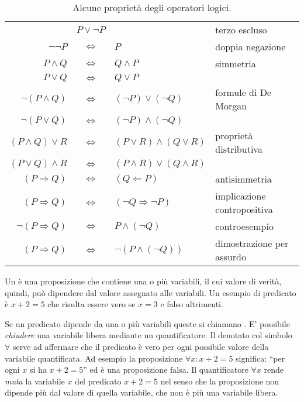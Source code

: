 \begin{table}
\begin{tabular}{rcll}
                         &$P \lor \neg P$&                                       &terzo escluso \\
                         $\neg \neg P$ & $\iff$ & $ P$                           & doppia negazione\\
                                    $P \land Q$ & $\iff$ & $ Q \land P$                   & simmetria\\
                                     $P \lor Q$ & $\iff$ & $ Q \lor P$                    & \\
                              $\neg (P\land Q)$ & $\iff$ & $ (\neg P) \lor (\neg Q)$      & formule di De Morgan\\
                               $\neg (P\lor Q)$ & $\iff$ & $ (\neg P) \land (\neg Q)$     & \\
                            $(P\land Q) \lor R$ & $\iff$ & $ (P\lor R) \land (Q \lor R)$  & proprietà distributiva\\
                            $(P\lor Q) \land R$ & $\iff$ & $ (P\land R) \lor (Q \land R)$ & \\
                            $(P \Rightarrow Q)$ & $\iff$ & $ (Q \Leftarrow P)$            & antisimmetria\\
                            $(P\Rightarrow Q)$ & $\iff$ & $ (\neg Q\Rightarrow\neg P)$   & implicazione contropositiva\\
                        $\neg (P\Rightarrow Q)$ & $\iff$ & $ P \land (\neg Q)$            & controesempio\\
                             $(P\Rightarrow Q)$ & $\iff$ & $ \lnot(P \land (\neg Q))$     & dimostrazione per assurdo
\end{tabular}
\caption{Alcune proprietà degli operatori logici.}
\label{tab:operatori_logici}
\end{table}

Un  è una proposizione che contiene
una o più variabili, il cui valore di verità, quindi,
può dipendere dal valore assegnato alle variabili.
Un esempio di predicato è $x+2=5$ che risulta essere vero se $x=3$
e falso altrimenti.

Se un predicato dipende da una o più variabili queste
si chiamano . E' possibile
\emph{chiudere} una variabile libera mediante un quantificatore.
Il  denotato col simbolo
$\forall$ serve ad affermare che il predicato è vero
per ogni possibile valore della variabile quantificata.
Ad esempio la proposizione $\forall x\colon x+2=5$ significa:
``per ogni $x$ si ha $x+2=5$'' ed è una proposizione falsa.
Il quantificatore $\forall x$ rende \emph{muta} la variabile
$x$ del predicato $x+2=5$ nel senso che la proposizione
non dipende più dal valore di quella variabile, che non è
più una variabile libera.

